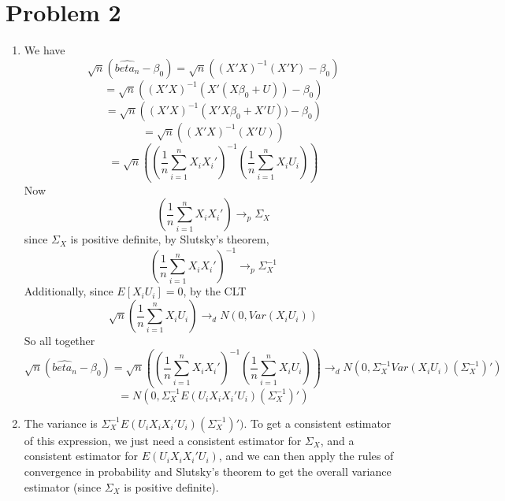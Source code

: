 \documentclass[10pt,letter]{article}
\begin{document}
\section*{Problem 2}
\begin{enumerate}[label=(\alph*)]
\item We have
\[ \sqrt{n} (\hat{beta_n} - \beta_0) = \sqrt{n}\left( (X'X) ^{-1}(X'Y) - \beta_0 \right) \]
\[ = \sqrt{n}\left( (X'X) ^{-1}(X'(X\beta_0 + U)) - \beta_0 \right) \]
\[ = \sqrt{n}\left( (X'X) ^{-1}(X'X\beta_0 + X'U)) - \beta_0 \right) \]
\[ = \sqrt{n}\left( (X'X) ^{-1}(X'U)\right) \]
\[ = \sqrt{n}\left( \left(\frac{1}{n}\sum_{i=1}^n X_iX_i' \right) ^{-1}\left(\frac{1}{n}\sum_{i=1}^n X_iU_i \right)\right) \]
Now
\[\left(\frac{1}{n}\sum_{i=1}^n X_iX_i' \right)  \to_p \Sigma_X \]
since $\Sigma_X$ is positive definite, by Slutsky's theorem,
\[ \left(\frac{1}{n}\sum_{i=1}^n X_iX_i' \right)^{-1}  \to_p \Sigma_X^{-1} \]
Additionally, since $E[X_iU_i] = 0$, by the CLT
\[\sqrt{n}\left(\frac{1}{n}\sum_{i=1}^n X_iU_i \right) \to_d N(0, Var(X_iU_i)) \]
So all together
\[ \sqrt{n} (\hat{beta_n} - \beta_0) = \sqrt{n}\left( \left(\frac{1}{n}\sum_{i=1}^n X_iX_i' \right) ^{-1}\left(\frac{1}{n}\sum_{i=1}^n X_iU_i \right)\right) \to_d N(0, \Sigma_X^{-1} Var(X_iU_i)(\Sigma_X^{-1})') \]\[= N(0, \Sigma_X^{-1} E(U_iX_iX_i'U_i)(\Sigma_X^{-1})')\]
\item  The variance is $\Sigma_X^{-1} E(U_iX_iX_i'U_i)(\Sigma_X^{-1})')$. To get a consistent estimator of this expression, we just need a consistent estimator for $\Sigma_X$, and a consistent estimator for $E(U_iX_iX_i'U_i)$, and we can then apply the rules of convergence in probability and Slutsky's theorem to get the overall variance estimator (since $\Sigma_X$ is positive definite).


\end{enumerate}
\end{document}
